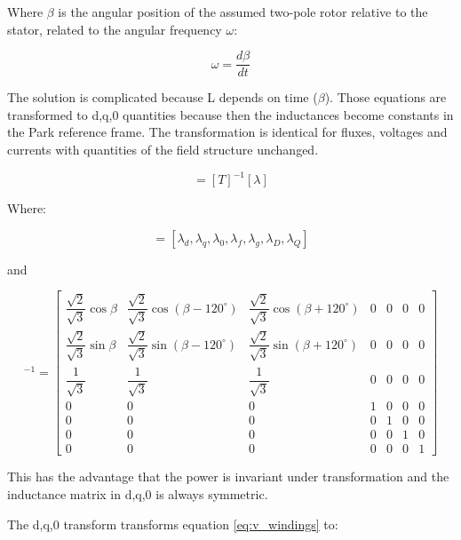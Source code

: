 Where $\beta$ is the angular position of the assumed two-pole rotor relative to the stator, related to the angular frequency $\omega$:

\begin{equation}
    \omega = \frac{d \beta}{d t}
\end{equation}

The solution is complicated because L depends on time ($\beta$). Those equations are transformed to d,q,0 quantities because then the inductances
become constants in the Park reference frame. The transformation is identical for fluxes, voltages and currents  with quantities of the field structure unchanged.

\begin{equation}
    [\lambda_{d,q,0}] = [T]^{-1}[\lambda]
\end{equation}

Where:

\begin{equation}
    [\lambda_{d,q,0}] = [\lambda_d, \lambda_q, \lambda_0, \lambda_f, \lambda_g, \lambda_D, \lambda_Q]
\end{equation}

and

\begin{equation}
[T]^{-1} =
\begin{bmatrix}
\dfrac{\sqrt{2}}{\sqrt{3}}\cos\beta &
\dfrac{\sqrt{2}}{\sqrt{3}}\cos(\beta - 120^\circ) &
\dfrac{\sqrt{2}}{\sqrt{3}}\cos(\beta + 120^\circ) &
0 & 0 & 0 & 0 \\[6pt]
\dfrac{\sqrt{2}}{\sqrt{3}}\sin\beta &
\dfrac{\sqrt{2}}{\sqrt{3}}\sin(\beta - 120^\circ) &
\dfrac{\sqrt{2}}{\sqrt{3}}\sin(\beta + 120^\circ) &
0 & 0 & 0 & 0 \\[6pt]
\dfrac{1}{\sqrt{3}} & \dfrac{1}{\sqrt{3}} & \dfrac{1}{\sqrt{3}} &
0 & 0 & 0 & 0 \\[6pt]
0 & 0 & 0 & 1 & 0 & 0 & 0 \\[6pt]
0 & 0 & 0 & 0 & 1 & 0 & 0 \\[6pt]
0 & 0 & 0 & 0 & 0 & 1 & 0 \\[6pt]
0 & 0 & 0 & 0 & 0 & 0 & 1
\end{bmatrix}
\label{eq:Parktransform}
\end{equation}

This has the advantage that the power is invariant under transformation and the inductance matrix in d,q,0 is always symmetric. 

The d,q,0 transform transforms equation \ref{eq:v_windings} to:

